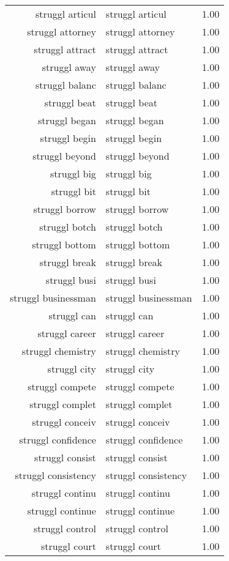 \begin{table}[ht]
\begin{tabular}{rlr}
  struggl articul & struggl articul & 1.00 \\ 
  struggl attorney & struggl attorney & 1.00 \\ 
  struggl attract & struggl attract & 1.00 \\ 
  struggl away & struggl away & 1.00 \\ 
  struggl balanc & struggl balanc & 1.00 \\ 
  struggl beat & struggl beat & 1.00 \\ 
  struggl began & struggl began & 1.00 \\ 
  struggl begin & struggl begin & 1.00 \\ 
  struggl beyond & struggl beyond & 1.00 \\ 
  struggl big & struggl big & 1.00 \\ 
  struggl bit & struggl bit & 1.00 \\ 
  struggl borrow & struggl borrow & 1.00 \\ 
  struggl botch & struggl botch & 1.00 \\ 
  struggl bottom & struggl bottom & 1.00 \\ 
  struggl break & struggl break & 1.00 \\ 
  struggl busi & struggl busi & 1.00 \\ 
  struggl businessman & struggl businessman & 1.00 \\ 
  struggl can & struggl can & 1.00 \\ 
  struggl career & struggl career & 1.00 \\ 
  struggl chemistry & struggl chemistry & 1.00 \\ 
  struggl city & struggl city & 1.00 \\ 
  struggl compete & struggl compete & 1.00 \\ 
  struggl complet & struggl complet & 1.00 \\ 
  struggl conceiv & struggl conceiv & 1.00 \\ 
  struggl confidence & struggl confidence & 1.00 \\ 
  struggl consist & struggl consist & 1.00 \\ 
  struggl consistency & struggl consistency & 1.00 \\ 
  struggl continu & struggl continu & 1.00 \\ 
  struggl continue & struggl continue & 1.00 \\ 
  struggl control & struggl control & 1.00 \\ 
  struggl court & struggl court & 1.00 \\ 

\end{tabular}
\end{table}
